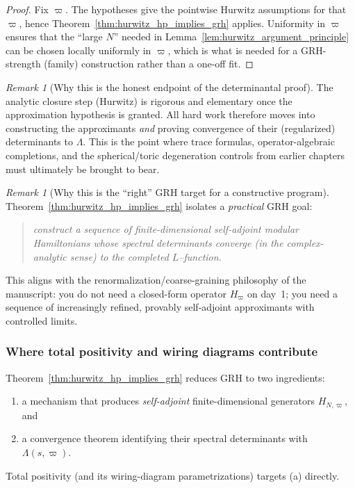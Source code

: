 \documentclass[11pt,oneside]{amsbook}
\numberwithin{equation}{section}
\theoremstyle{plain}
\theoremstyle{definition}
\theoremstyle{remark}
\newtheorem{remark}[theorem]{Remark}
\begin{document}
\begin{proof}
Fix $\varpi$.
The hypotheses give the pointwise Hurwitz assumptions for that $\varpi$, hence Theorem~\ref{thm:hurwitz_hp_implies_grh} applies.
Uniformity in $\varpi$ ensures that the ``large $N$'' needed in Lemma~\ref{lem:hurwitz_argument_principle} can be chosen locally uniformly in $\varpi$, which is what is needed for a GRH-strength (family) construction rather than a one-off fit.
\end{proof}

\begin{remark}[Why this is the honest endpoint of the determinantal proof]
The analytic closure step (Hurwitz) is rigorous and elementary once the approximation hypothesis is granted.
All hard work therefore moves into constructing the approximants \emph{and} proving convergence of their (regularized) determinants to $\Lambda$.
This is the point where trace formulas, operator-algebraic completions, and the spherical/toric degeneration controls from earlier chapters must ultimately be brought to bear.
\end{remark}


\begin{remark}[Why this is the ``right'' GRH target for a constructive program]
Theorem~\ref{thm:hurwitz_hp_implies_grh} isolates a \emph{practical} GRH goal:
\begin{quote}
\emph{construct a sequence of finite-dimensional self-adjoint modular Hamiltonians whose spectral determinants converge (in the complex-analytic sense) to the completed $L$--function.}
\end{quote}
This aligns with the renormalization/coarse-graining philosophy of the manuscript:
you do not need a closed-form operator $H_\varpi$ on day~1; you need a sequence of increasingly refined, provably self-adjoint approximants with controlled limits.
\end{remark}

\subsubsection{Where total positivity and wiring diagrams contribute}

Theorem~\ref{thm:hurwitz_hp_implies_grh} reduces GRH to two ingredients:
\begin{enumerate}[label=(\alph*)]
\item a mechanism that produces \emph{self-adjoint} finite-dimensional generators $H_{N,\varpi}$, and
\item a convergence theorem identifying their spectral determinants with $\Lambda(s,\varpi)$.
\end{enumerate}
Total positivity (and its wiring-diagram parametrizations) targets (a) directly.
\end{document}

